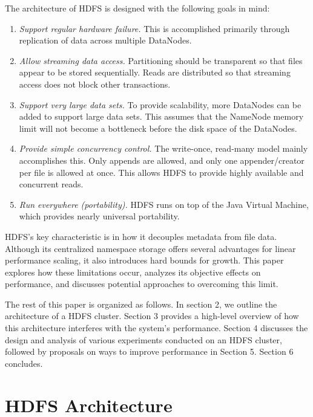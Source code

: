 \documentclass[11pt, a4paper]{article}
\begin{document}
\begin{multicols*}{2}
The architecture of HDFS is designed with the following goals in mind:
\begin{enumerate}[noitemsep, label=\arabic*.]
	\item\textit{Support regular hardware failure.} This is accomplished primarily through replication of data across multiple DataNodes.
	\item\textit{Allow streaming data access.} Partitioning should be transparent so that files appear to be stored sequentially. Reads are distributed so that streaming access does not block other transactions.
	\item\textit{Support very large data sets.} To provide scalability, more DataNodes can be added to support large data sets. This assumes that the NameNode memory limit will not become a bottleneck before the disk space of the DataNodes.
	\item\textit{Provide simple concurrency control.} The write-once, read-many model mainly accomplishes this. Only appends are allowed, and only one appender/creator per file is allowed at once. This allows HDFS to provide highly available and concurrent reads.
	\item\textit{Run everywhere (portability).} HDFS runs on top of the Java Virtual Machine, which provides nearly universal portability.
\end{enumerate}

HDFS's key characteristic is in how it decouples metadata from file data. Although its centralized namespace storage offers several advantages for linear performance scaling, it also introduces hard bounds for growth. This paper explores how these limitations occur, analyzes its objective effects on performance, and discusses potential approaches to overcoming this limit.

The rest of this paper is organized as follows. In section 2, we outline the architecture of a HDFS cluster. Section 3 provides a high-level overview of how this architecture interferes with the system's performance. Section 4 discusses the design and analysis of various experiments conducted on an HDFS cluster, followed by proposals on ways to improve performance in Section 5. Section 6 concludes.

\section{HDFS Architecture}


\end{multicols*}
\end{document}
